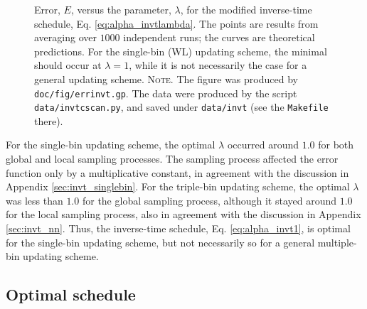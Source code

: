 \documentclass[reprint, superscriptaddress, floatfix]{revtex4-1}
\newcommand{\note}[1]{{\color{DarkGreen}\footnotesize \textsc{Note.} #1}}
\newcommand{\Err}{E}
\begin{document}
\begin{figure}[h]
\begin{center}
  \caption{
    \label{fig:errinvt}
    Error, $\Err$, versus the parameter, $\lambda$,
    for the modified inverse-time schedule,
    Eq. \eqref{eq:alpha_invtlambda}.
    The points are results from averaging over $1000$ independent runs;
    the curves are theoretical predictions.
    For the single-bin (WL) updating scheme,
    the minimal should occur at $\lambda = 1$,
    while it is not necessarily the case for a general updating scheme.
    \note{The figure was produced by \texttt{doc/fig/errinvt.gp}.
      The data were produced by the script \texttt{data/invtcscan.py},
      and saved under \texttt{data/invt}
      (see the \texttt{Makefile} there).
    }%
  }
\end{center}
\end{figure}

For the single-bin updating scheme,
the optimal $\lambda$ occurred around $1.0$
for both global and local sampling processes.
%
The sampling process affected the error function
only by a multiplicative constant,
in agreement with the discussion in
Appendix \ref{sec:invt_singlebin}.
%
For the triple-bin updating scheme,
the optimal $\lambda$ was less than $1.0$
for the global sampling process,
although it stayed around $1.0$
for the local sampling process,
also in agreement with the discussion
in Appendix \ref{sec:invt_nn}.
%
Thus, the inverse-time schedule,
Eq. \eqref{eq:alpha_invt1},
is optimal for the single-bin updating scheme,
but not necessarily so for a general multiple-bin updating scheme.
%




\subsection{\label{sec:results_optschedule}
Optimal schedule}
\end{document}
